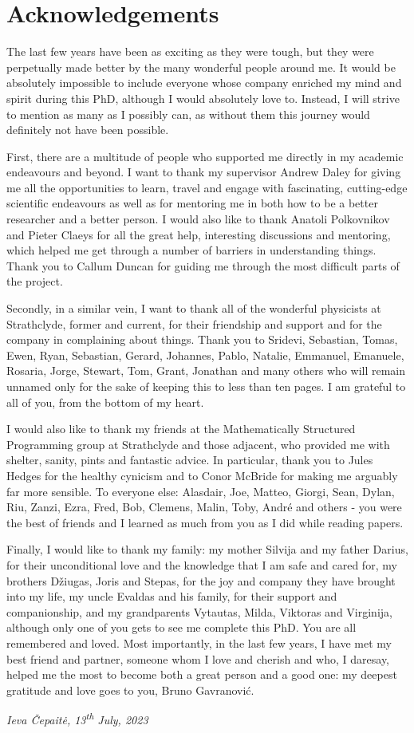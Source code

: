 \chapter{Acknowledgements}

The last few years have been as exciting as they were tough, but they were perpetually made better by the many wonderful people around me. It would be absolutely impossible to include everyone whose company enriched my mind and spirit during this PhD, although I would absolutely love to. Instead, I will strive to mention as many as I possibly can, as without them this journey would definitely not have been possible.

First, there are a multitude of people who supported me directly in my academic endeavours and beyond. I want to thank my supervisor Andrew Daley for giving me all the opportunities to learn, travel and engage with fascinating, cutting-edge scientific endeavours as well as for mentoring me in both how to be a better researcher and a better person. I would also like to thank Anatoli Polkovnikov and Pieter Claeys for all the great help, interesting discussions and mentoring, which helped me get through a number of barriers in understanding things. Thank you to Callum Duncan for guiding me through the most difficult parts of the project.

Secondly, in a similar vein, I want to thank all of the wonderful physicists at Strathclyde, former and current, for their friendship and support and for the company in complaining about things. Thank you to Sridevi, Sebastian, Tomas, Ewen, Ryan, Sebastian, Gerard, Johannes, Pablo, Natalie, Emmanuel, Emanuele, Rosaria, Jorge, Stewart, Tom, Grant, Jonathan and many others who will remain unnamed only for the sake of keeping this to less than ten pages. I am grateful to all of you, from the bottom of my heart. 

I would also like to thank my friends at the Mathematically Structured Programming group at Strathclyde and those adjacent, who provided me with shelter, sanity, pints and fantastic advice. In particular, thank you to Jules Hedges for the healthy cynicism and to Conor McBride for making me arguably far more sensible. To everyone else: Alasdair, Joe, Matteo, Giorgi, Sean, Dylan, Riu, Zanzi, Ezra, Fred, Bob, Clemens, Malin, Toby, André and others - you were the best of friends and I learned as much from you as I did while reading papers.

Finally, I would like to thank my family: my mother Silvija and my father Darius, for their unconditional love and the knowledge that I am safe and cared for, my brothers Džiugas, Joris and Stepas, for the joy and company they have brought into my life, my uncle Evaldas and his family, for their support and companionship, and my grandparents Vytautas, Milda, Viktoras and Virginija, although only one of you gets to see me complete this PhD. You are all remembered and loved. Most importantly, in the last few years, I have met my best friend and partner, someone whom I love and cherish and who, I daresay, helped me the most to become both a great person and a good one: my deepest gratitude and love goes to you, Bruno Gavranović.

\begin{flushright}
\emph{Ieva \v{C}epait\.{e}, 13\textsuperscript{th} July, 2023}
\end{flushright}